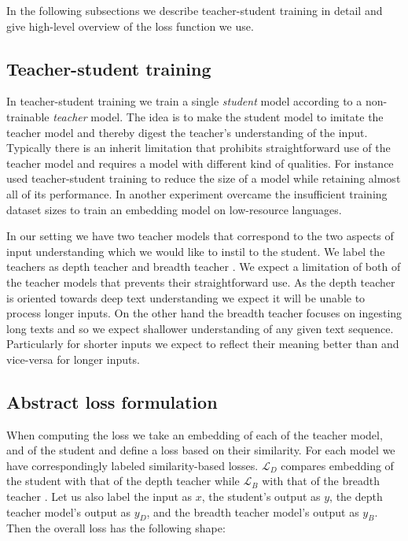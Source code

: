 In the following subsections we describe teacher-student training in detail and
give high-level overview of the loss function we use.

\subsection{Teacher-student training}

In teacher-student training we train a single \emph{student} model according to
a non-trainable \emph{teacher} model. The idea is to make the student model to
imitate the teacher model and thereby digest the teacher's understanding of the
input. Typically there is an inherit limitation that prohibits straightforward
use of the teacher model and requires a model with different kind of qualities.
For instance \cite{sanh2019distilbert} used teacher-student training to reduce
the size of a model while retaining almost all of its performance. In another
experiment \cite{reimers2020making} overcame the insufficient training dataset
sizes to train an embedding model on low-resource languages.

In our setting we have two teacher models that correspond to the two aspects of
input understanding which we would like to instil to the student. We label the
teachers as depth teacher {\Md} and breadth teacher {\Mb}. We expect a
limitation of both of the teacher models that prevents their straightforward
use. As the depth teacher is oriented towards deep text understanding we expect
it will be unable to process longer inputs. On the other hand the breadth
teacher focuses on ingesting long texts and so we expect shallower understanding
of any given text sequence. Particularly for shorter inputs we expect {\Md} to
reflect their meaning better than {\Mb} and vice-versa for longer inputs.


\subsection{Abstract loss formulation}


When computing the loss we take an embedding of each of the teacher model, and
of the student and define a loss based on their similarity. For each model we
have correspondingly labeled similarity-based losses. $\mathcal{L}_D$ compares
embedding of the student with that of the depth teacher {\Md} while
$\mathcal{L}_B$ with that of the breadth teacher {\Mb}. Let us also label the
input as $x$, the student's output as $y$, the depth teacher model's output as
$y_D$, and the breadth teacher model's output as $y_B$. Then the overall loss
has the following shape:

